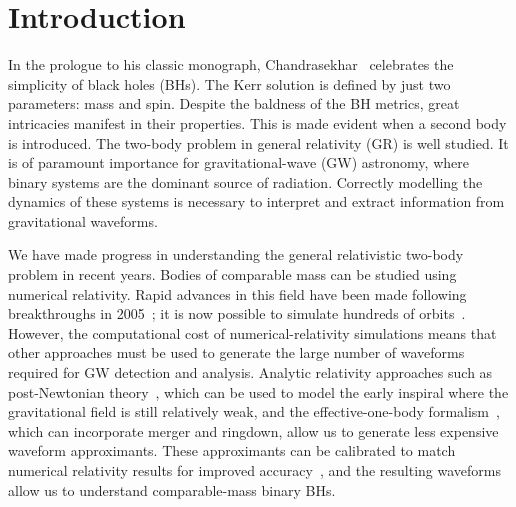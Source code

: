 \documentclass[aps,prd,amsfonts,amssymb,amsmath,nofootinbib,showpacs,superscriptaddress,twocolumn,floatfix]{revtex4-1}
\begin{document}

\maketitle

\section{Introduction}
 
In the prologue to his classic monograph, Chandrasekhar~\cite{Chandrasekhar1992} celebrates the simplicity of black holes (BHs). The Kerr solution is defined by just two parameters: mass and spin. Despite the baldness of the BH metrics, great intricacies manifest in their properties. This is made evident when a second body is introduced. The two-body problem in general relativity (GR) is well studied. It is of paramount importance for gravitational-wave (GW) astronomy, where binary systems are the dominant source of radiation. Correctly modelling the dynamics of these systems is necessary to interpret and extract information from gravitational waveforms.

We have made progress in understanding the general relativistic two-body problem in recent years. Bodies of comparable mass can be studied using numerical relativity. Rapid advances in this field have been made following breakthroughs in 2005~\cite{Pretorius2005,Campanelli2006,Baker2006}; it is now possible to simulate hundreds of orbits~\cite{Szilagyi2015}. However, the computational cost of numerical-relativity simulations means that other approaches must be used to generate the large number of waveforms required for GW detection and analysis. Analytic relativity approaches such as post-Newtonian theory~\cite{Blanchet2014,Buonanno2009}, which can be used to model the early inspiral where the gravitational field is still relatively weak, and the effective-one-body formalism~\cite{Buonanno1999,Buonanno2000,Damour2009,Barausse2010}, which can incorporate merger and ringdown, allow us to generate less expensive waveform approximants. These approximants can be calibrated to match numerical relativity results for improved accuracy~\cite{Taracchini2014,Pan2014,Husa2015,Khan2015,Schmidt2015}, and the resulting waveforms allow us to understand comparable-mass binary BHs.
\end{document}
